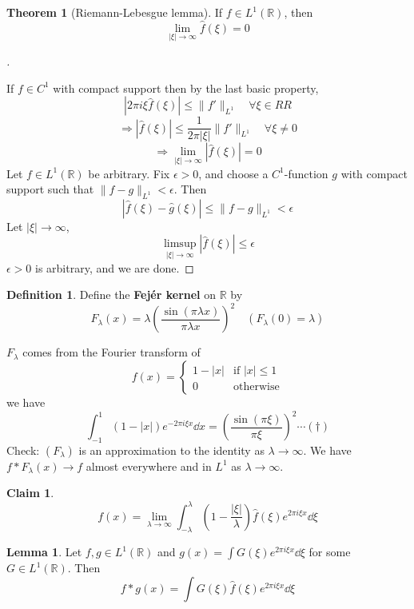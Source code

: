 \documentclass{article}
\theoremstyle{definition}
\newtheorem{thm}{Theorem}
\newtheorem{lem}{Lemma}
\newtheorem{dfn}{Definition}
\newtheorem*{clm}{Claim}
\newenvironment{proofs}[1][\proofname]{%
  \begin{proof}[#1]$ $\par\nobreak\ignorespaces
}{%
  \end{proof}
}
\newcommand{\RR}{\mathbb R}
\newcommand{\Ra}{\Rightarrow}
\begin{document}
\begin{thm}[Riemann-Lebesgue lemma]
	If $f \in L^1(\RR)$, then
	\[
		\lim_{|\xi| \to \infty} \widehat{f}(\xi) = 0
	\]
\end{thm}

\begin{proofs}
	If $f \in C^1$ with compact support then by the last basic property, 
	\[
		|2 \pi i \xi \widehat{f}(\xi)| \leq \|f'\|_{L^1} \quad \forall \xi \in RR
	\]
	\[
		\Ra |\widehat{f}(\xi)| \leq \frac{1}{2 \pi |\xi|} \|f'\|_{L^1} \quad \forall \xi \neq 0
	\]
	\[
		\Ra \lim_{|\xi| \to \infty} |\widehat{f}(\xi)| = 0
	\]
	Let $f \in L^1(\RR)$ be arbitrary.
	Fix $\epsilon > 0$, and choose a $C^1$-function $g$ with compact support such that $\|f - g\|_{L^1} < \epsilon$.
	Then 
	\[
		|\widehat{f}(\xi) - \widehat{g}(\xi)| \leq \|f - g\|_{L^1} < \epsilon
	\]
	Let $|\xi| \to \infty$, 
	\[
		\limsup_{|\xi| \to \infty} |\widehat{f}(\xi)| \leq \epsilon
	\]
	$\epsilon > 0$ is arbitrary, and we are done.
\end{proofs}

\begin{dfn}
	Define the \textbf{Fej\'er kernel} on $\RR$ by 
	\[
		F_\lambda(x) = \lambda \left( \frac{\sin (\pi \lambda x)}{\pi \lambda x} \right)^2 \quad (F_\lambda(0) = \lambda)
	\]
\end{dfn}

$F_\lambda$ comes from the Fourier transform of 
\[
	f(x) = 
	\begin{cases}
		1 - |x| & \text{if } |x| \leq 1\\
		0 & \text{otherwise}
	\end{cases}
\]
we have
\[
	\int_{-1}^1 (1 - |x|) e^{- 2 \pi i \xi x} \dd{x} = \left( \frac{\sin (\pi \xi)}{\pi \xi} \right)^2 \cdots (\dagger)
\]
Check: $(F_\lambda)$ is an approximation to the identity as $\lambda \to \infty$.
We have $f * F_\lambda(x) \to f$ almost everywhere and in $L^1$ as $\lambda \to \infty$.

\begin{clm}
	\[
		f(x) = \lim_{\lambda \to \infty} \int_{-\lambda}^\lambda \left( 1 - \frac{|\xi|}{\lambda} \right) \widehat{f}(\xi) e^{2 \pi i \xi x} \dd{\xi}
	\]
\end{clm}

\begin{lem}
	Let $f, g \in L^1(\RR)$ and $g(x) = \int G(\xi) e^{2 \pi i \xi x} \dd{\xi}$ for some $G \in L^1(\RR)$.
	Then 
	\[
		f * g(x) = \int G(\xi) \widehat{f}(\xi) e^{2 \pi i \xi x} \dd{\xi}
	\]
\end{lem}
\end{document}
